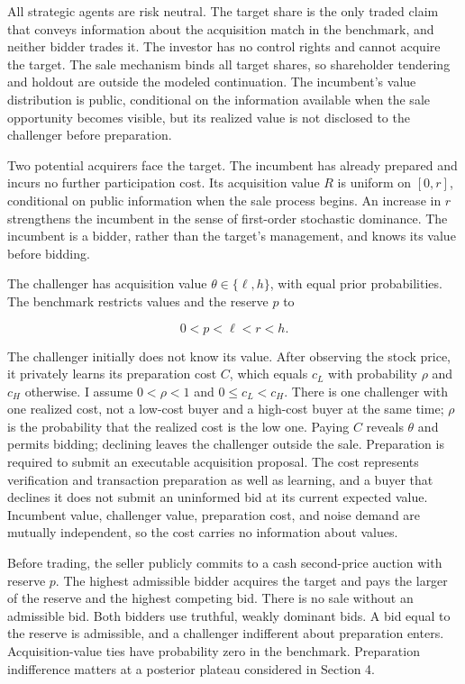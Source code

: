 \documentclass[
  12pt,
]{article}
\begin{document}
All strategic agents are risk neutral. The target share is the only
traded claim that conveys information about the acquisition match in the
benchmark, and neither bidder trades it. The investor has no control
rights and cannot acquire the target. The sale mechanism binds all
target shares, so shareholder tendering and holdout are outside the
modeled continuation. The incumbent's value distribution is public,
conditional on the information available when the sale opportunity
becomes visible, but its realized value is not disclosed to the
challenger before preparation.

Two potential acquirers face the target. The incumbent has already
prepared and incurs no further participation cost. Its acquisition value
\(R\) is uniform on \([0,r]\), conditional on public information when
the sale process begins. An increase in \(r\) strengthens the incumbent
in the sense of first-order stochastic dominance. The incumbent is a
bidder, rather than the target's management, and knows its value before
bidding.

The challenger has acquisition value \(\theta\in\{\ell,h\}\), with equal
prior probabilities. The benchmark restricts values and the reserve
\(p\) to

\[
0<p<\ell<r<h.
\tag{1}\label{eq:paper-1}
\]

The challenger initially does not know its value. After observing the
stock price, it privately learns its preparation cost \(C\), which
equals \(c_L\) with probability \(\rho\) and \(c_H\) otherwise. I assume
\(0<\rho<1\) and \(0\le c_L<c_H\). There is one challenger with one
realized cost, not a low-cost buyer and a high-cost buyer at the same
time; \(\rho\) is the probability that the realized cost is the low one.
Paying \(C\) reveals \(\theta\) and permits bidding; declining leaves
the challenger outside the sale. Preparation is required to submit an
executable acquisition proposal. The cost represents verification and
transaction preparation as well as learning, and a buyer that declines
it does not submit an uninformed bid at its current expected value.
Incumbent value, challenger value, preparation cost, and noise demand
are mutually independent, so the cost carries no information about
values.

Before trading, the seller publicly commits to a cash second-price
auction with reserve \(p\). The highest admissible bidder acquires the
target and pays the larger of the reserve and the highest competing bid.
There is no sale without an admissible bid. Both bidders use truthful,
weakly dominant bids. A bid equal to the reserve is admissible, and a
challenger indifferent about preparation enters. Acquisition-value ties
have probability zero in the benchmark. Preparation indifference matters
at a posterior plateau considered in Section 4.
\end{document}
